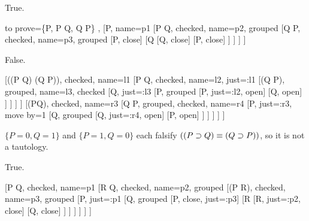 \begin{earg}

\item True.

	\begin{prooftree}
	{
	to prove={\{P, P \eif Q, Q \eif \enot P\} \vdash{}\bot},
	}
	[P, name=p1
	[P \eif Q, checked, name=p2, grouped
	[Q \eif \enot P, checked, name=p3, grouped
		[\enot P, close]
		[Q
			[\enot Q, close]
			[\enot P, close]
		]
	]
	]
	]
	\end{prooftree}

\item False.

	\begin{prooftree}
	{
	}
	[\enot((P \eif Q) \eiff (Q \eif P)), checked, name=l1
		[P \eif Q, checked, name=l2, just={\enot \eiff}:l1
			[\enot (Q \eif P), grouped, name=l3, checked 
				[Q, just={\enot \eif}:l3
				[\enot P, grouped
					[\enot P, just={\eif}:l2, open]
					[Q, open]
				]
				]
			]
		]
		[\enot (P\eif Q), checked, name=r3
		[Q \eif P, grouped, checked, name=r4
			[P, just={\enot \eif}:r3, move by=1
			[\enot Q, grouped
				[\enot Q, just={\eif}:r4, open]
				[P, open]
			]
			]
		]
		]
	]
	\end{prooftree}

$\{P=0, Q=1\}$ and $\{P=1, Q=0\}$ each falsify $((P \supset Q) \equiv (Q \supset P))$, so it is not a tautology.



\item True.

	\begin{prooftree}
	{
	}
	[P \eand Q, checked, name=p1
	[\enot R \eif \enot Q, checked, name=p2, grouped
	[\enot (P \eand R), checked, name=p3, grouped
		[P, just={\eand}:p1
		[Q, grouped
			[\enot P, close, just={\enot \eand}:p3]
			[\enot R
				[\enot \enot R, just={\eif}:p2, close]
				[\enot Q, close]
			]
		]
		]
	]
	]
	]
	\end{prooftree}
	




\end{earg}
